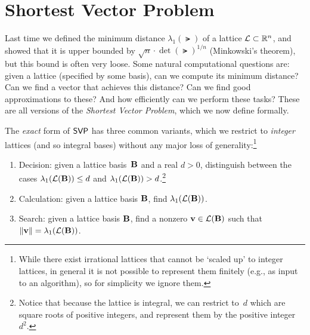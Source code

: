 \documentclass[11pt]{article}
\begin{document}
\thispagestyle{fancy} %


\newcommand{\estsvp}{\cproblem{EstSVP}}

\theoremstyle{plain} \newtheorem{openproblem}[theorem]{Open Problem}

\section{Shortest Vector Problem}
\label{sec:svp}

Last time we defined the minimum distance $\lambda_{1}(\lat)$ of a
lattice $\mathcal{L} \subset \mathbb{R}^{n}$, and showed that it is upper bounded by
$\sqrt{n} \cdot \det(\lat)^{1/n}$ (Minkowski's theorem), but this
bound is often very loose. Some natural computational questions are:
given a lattice (specified by some basis), can we compute its minimum
distance? Can we find a vector that achieves this distance? Can we
find good approximations to these? And how efficiently can we perform
these tasks? These are all versions of the \emph{Shortest Vector
  Problem}, which we now define formally.

\begin{definition}
  \label{def:svp}
  The \emph{exact} form of $\mathsf{SVP}$ has three common variants, which we
  restrict to \emph{integer} lattices (and so integral bases) without
  any major loss of generality:\footnote{While there exist irrational
    lattices that cannot be `scaled up' to integer lattices, in
    general it is not possible to represent them finitely (e.g., as
    input to an algorithm), so for simplicity we ignore them.}
  \begin{enumerate}[itemsep=0pt]
  \item Decision: given a lattice basis~$\mathbf{B}$ and a real $d > 0$,
    distinguish between the cases $\lambda_1(\mathcal{L}(\mathbf{B})) \leq d$ and
    $\lambda_1(\mathcal{L}(\mathbf{B})) > d$.\footnote{Notice that because the
      lattice is integral, we can restrict to~$d$ which are square
      roots of positive integers, and represent them by the positive
      integer~$d^{2}$.}

  \item Calculation: given a lattice basis $\mathbf{B}$, find
    $\lambda_1(\mathcal{L}(\mathbf{B}))$.

  \item Search: given a lattice basis $\mathbf{B}$, find a nonzero
    $\mathbf{v} \in \mathcal{L}(\mathbf{B})$ such that
    $\lVert\mathbf{v}\rVert = \lambda_1(\mathcal{L}(\mathbf{B}))$.
  \end{enumerate}
\end{definition}
\end{document}
